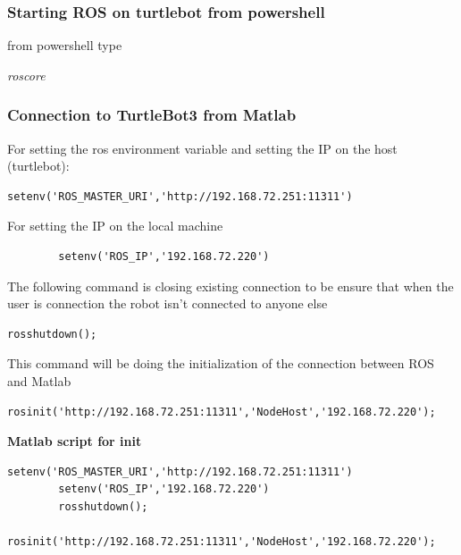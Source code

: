 \documentclass[12pt,a4paper]{article}
\begin{document}
	\subsubsection{Starting ROS on turtlebot from powershell}
	from powershell type
	\begin{center}
		\textit{roscore}
	\end{center}
	\subsubsection{Connection to TurtleBot3 from Matlab}
	For setting the ros environment variable and setting the IP on the host (turtlebot):
	\begin{lstlisting}[style=Matlab-editor]
		setenv('ROS_MASTER_URI','http://192.168.72.251:11311')\end{lstlisting}
	For setting the IP on the local machine 
	\begin{lstlisting}
		setenv('ROS_IP','192.168.72.220')\end{lstlisting}
	The following command is closing existing connection to be ensure that when the user is connection the robot isn't connected to anyone else
	\begin{lstlisting}[style=Matlab-editor]
		rosshutdown();\end{lstlisting}
	This command will be doing the initialization of the connection between ROS and Matlab
	\begin{lstlisting}[style=Matlab-editor]
		rosinit('http://192.168.72.251:11311','NodeHost','192.168.72.220');\end{lstlisting} 
	\vspace{1cm}
	\noindent\textbf{Matlab script for init}
	\begin{lstlisting}[style=Matlab-editor]
		setenv('ROS_MASTER_URI','http://192.168.72.251:11311')
		setenv('ROS_IP','192.168.72.220')
		rosshutdown();
		rosinit('http://192.168.72.251:11311','NodeHost','192.168.72.220');\end{lstlisting}
\end{document}
